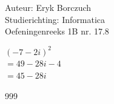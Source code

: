\documentclass[a4paper]{article}
\begin{document}
  
\noindent \large Auteur: Eryk Borczuch \\
\noindent \large Studierichting: Informatica\\
\noindent \large Oefeningenreeks 1B nr. 17.8\\

\medskip

\normalsize

$(-7-2i)^2$\\

$=49-28i-4$\\

$=45-28i$\\

\begin{thebibliography}{999}
\end{thebibliography}
\end{document}
